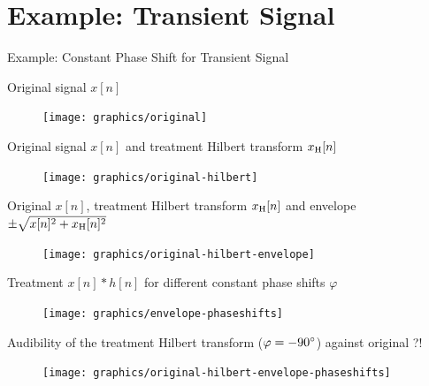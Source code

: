 \documentclass[mathserif]{intbeamer}
\begin{document}
\section{Example: Transient Signal}
\begin{frame}{Example: Constant Phase Shift for Transient Signal}
{
Original signal $x[n]$
\begin{figure}
\texttt{[image: graphics/original]}
\end{figure}
}
{
Original signal $x[n]$ and treatment Hilbert transform $x_{\mathrm{H}}[n]$
\begin{figure}
\texttt{[image: graphics/original-hilbert]}
\end{figure}
}
{
Original $x[n]$, treatment Hilbert transform $x_{\mathrm{H}}[n]$ and envelope
$\pm\sqrt{x[n]^2+x_{\mathrm{H}}[n]^2}$
\begin{figure}
\texttt{[image: graphics/original-hilbert-envelope]}
\end{figure}
}
{
Treatment $x[n]\ast h[n]$ for different constant phase shifts $\varphi$
\begin{figure}
\texttt{[image: graphics/envelope-phaseshifts]}
\end{figure}
}
{
Audibility of the treatment Hilbert transform ($\varphi=-90\degree$) against original ?!
\begin{figure}
\texttt{[image: graphics/original-hilbert-envelope-phaseshifts]}
\end{figure}
}
\end{frame}
%
%
%
\end{document}

